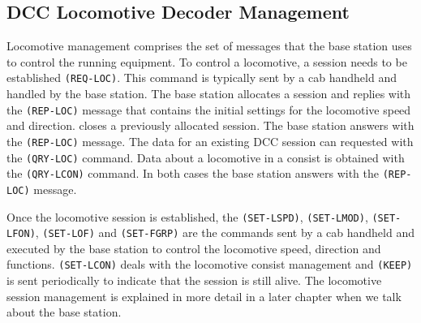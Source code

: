 \subsection{DCC Locomotive Decoder Management}

Locomotive management comprises the set of messages that the base station uses to control the running equipment. To control a locomotive, a session needs to be established \texttt{(REQ-LOC)}. This command is typically sent by a cab handheld and handled by the base station. The base station allocates a session and replies with the \texttt{(REP-LOC)} message that contains the initial settings for the locomotive speed and direction.  closes a previously allocated session. The base station answers with the \texttt{(REP-LOC)} message. The data for an existing DCC session can requested with the \texttt{(QRY-LOC)} command. Data about a locomotive in a consist is obtained with the \texttt{(QRY-LCON)} command. In both cases the base station answers with the \texttt{(REP-LOC)} message.

\begin{table}[ht!]
    \centering 
    \caption{DCC Locomotive Decoder Management}
\end{table}

Once the locomotive session is established, the \texttt{(SET-LSPD)}, \texttt{(SET-LMOD)}, \texttt{(SET-LFON)}, \texttt{(SET-LOF)} and \texttt{(SET-FGRP)} are the commands sent by a cab handheld and executed by the base station to control the locomotive speed, direction and functions. \texttt{(SET-LCON)} deals with the locomotive consist management and \texttt{(KEEP)} is sent periodically to indicate that the session is still alive. The locomotive session management is explained in more detail in a later chapter when we talk about the base station.

